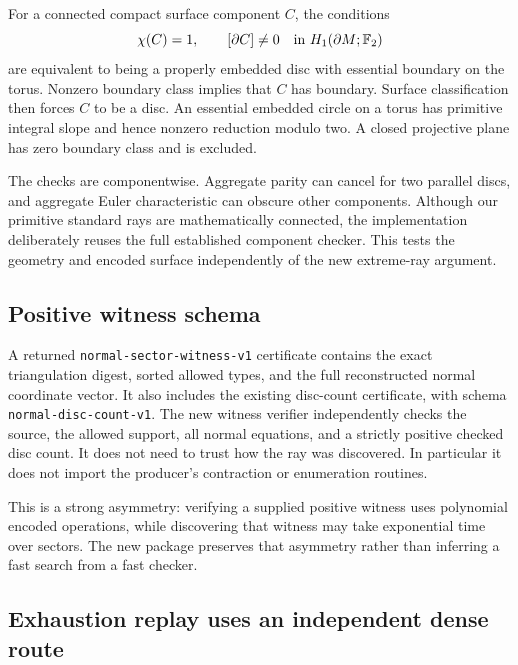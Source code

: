 \documentclass[11pt]{article}
\theoremstyle{definition}
\theoremstyle{remark}
\newcommand{\F}{\mathbb F_2}
\newcommand{\code}[1]{\texttt{#1}}
\begin{document}
For a connected compact surface component $C$, the conditions
\begin{equation}
 \chi(C)=1,\qquad
 [\partial C]\ne0\quad\hbox{in }H_1(\partial M;\F)
 \label{eq:disccondition}
\end{equation}
are equivalent to being a properly embedded disc with essential boundary
on the torus. Nonzero boundary class implies that $C$ has boundary. Surface
classification then forces $C$ to be a disc. An essential embedded circle
on a torus has primitive integral slope and hence nonzero reduction modulo
two. A closed projective plane has zero boundary class and is excluded.

The checks are componentwise. Aggregate parity can cancel for two parallel
discs, and aggregate Euler characteristic can obscure other components.
Although our primitive standard rays are mathematically connected, the
implementation deliberately reuses the full established component checker.
This tests the geometry and encoded surface independently of the new
extreme-ray argument.

\subsection{Positive witness schema}

A returned \code{normal-sector-witness-v1} certificate contains the exact
triangulation digest, sorted allowed types, and the full reconstructed normal
coordinate vector. It also includes the existing disc-count certificate,
with schema \code{normal-disc-count-v1}.
The new witness verifier independently checks the source, the allowed support,
all normal equations, and a strictly positive checked disc count. It does not
need to trust how the ray was discovered. In particular it does not import
the producer's contraction or enumeration routines.

This is a strong asymmetry: verifying a supplied positive witness uses
polynomial encoded operations, while discovering that witness may take
exponential time over sectors. The new package preserves that asymmetry
rather than inferring a fast search from a fast checker.

\subsection{Exhaustion replay uses an independent dense route}
\end{document}
